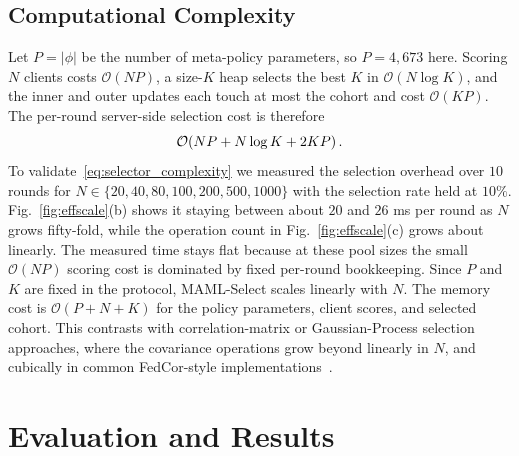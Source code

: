 \documentclass[journal]{IEEEtran}
\theoremstyle{remark}
\newcommand{\revision}[1]{#1}
\begin{document}
\subsection{Computational Complexity}
\revision{Let $P=|\phi|$ be the number of meta-policy parameters, so $P=4{,}673$ here. Scoring $N$ clients costs $\mathcal{O}(NP)$, a size-$K$ heap selects the best $K$ in $\mathcal{O}(N\log K)$, and the inner and outer updates each touch at most the cohort and cost $\mathcal{O}(KP)$. The per-round server-side selection cost is therefore}
\begin{equation}
	\color{black}
	\mathcal{O}\!\left(NP + N\log K + 2KP\right).
	\label{eq:selector_complexity}
\end{equation}
\revision{To validate~\eqref{eq:selector_complexity} we measured the selection overhead over $10$ rounds for $N\in\{20,40,80,100,200,500,1000\}$ with the selection rate held at $10\%$. Fig.~\ref{fig:effscale}(b) shows it staying between about $20$ and $26$ ms per round as $N$ grows fifty-fold, while the operation count in Fig.~\ref{fig:effscale}(c) grows about linearly. The measured time stays flat because at these pool sizes the small $\mathcal{O}(NP)$ scoring cost is dominated by fixed per-round bookkeeping. Since $P$ and $K$ are fixed in the protocol, MAML-Select scales linearly with $N$. The memory cost is $\mathcal{O}(P+N+K)$ for the policy parameters, client scores, and selected cohort. This contrasts with correlation-matrix or Gaussian-Process selection approaches, where the covariance operations grow beyond linearly in $N$, and cubically in common FedCor-style implementations~\cite{tang2022fedcor}.}

\section{Evaluation and Results}
\end{document}
